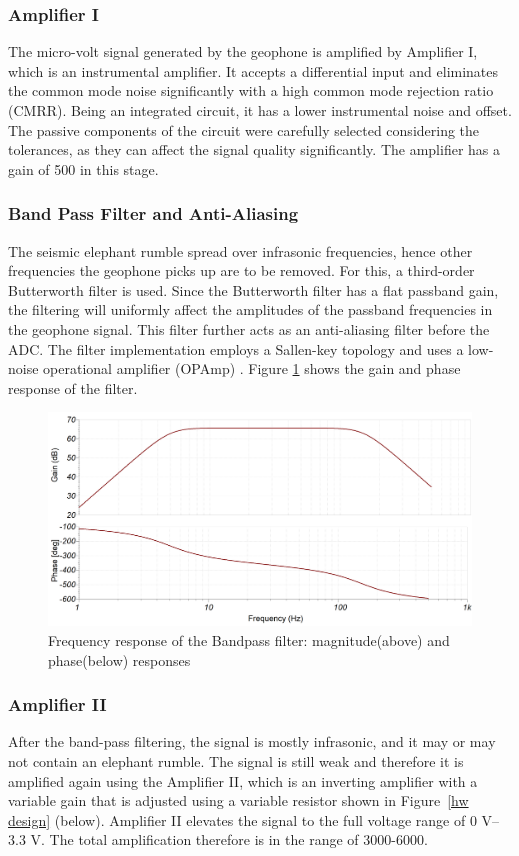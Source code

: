 \documentclass[applsci,article,accept,moreauthors,pdftex]{Definitions/mdpi}
\begin{document}
\subsubsection{Amplifier I}
The micro-volt signal generated by the geophone is amplified by Amplifier I, which is an instrumental amplifier. It accepts a differential input and eliminates the common mode noise significantly with a high common mode rejection ratio (CMRR). Being an integrated circuit, it has a lower instrumental noise and offset. The passive components of the circuit were carefully selected considering the tolerances, as they can affect the signal quality significantly. The amplifier has a gain of 500 in this stage.

\subsubsection{Band Pass Filter and Anti-Aliasing}
The seismic elephant rumble spread over infrasonic frequencies, hence other frequencies the geophone picks up are to be removed. For this, a third-order Butterworth filter is used. Since the Butterworth filter has a flat passband gain, the filtering will uniformly affect the amplitudes of the passband frequencies in the geophone signal. This filter further acts as an anti-aliasing filter before the ADC. The filter implementation employs a Sallen-key topology and uses a low-noise operational amplifier (OPAmp) \cite{zumbahlen2007phase}. Figure \ref{fig:bandpass1} shows the gain and phase response of the filter.
\begin{figure}[h]
	\centering   \includegraphics[width=1\columnwidth]{figures/BodePlot}
	\caption{Frequency response of the Bandpass filter: magnitude(above) and phase(below) responses}
	\label{fig:bandpass1}
\end{figure}
\subsubsection{Amplifier II}
After the band-pass filtering, the signal is mostly infrasonic, and it may or may not contain an elephant rumble. The signal is still weak and therefore it is amplified again using the Amplifier II, which is an inverting amplifier with a variable gain that is adjusted using a variable resistor shown in Figure~\ref{hw design} (below). Amplifier II elevates the signal to the full voltage range of 0 V–3.3 V. The total amplification therefore is in the range of 3000-6000.
\end{document}
